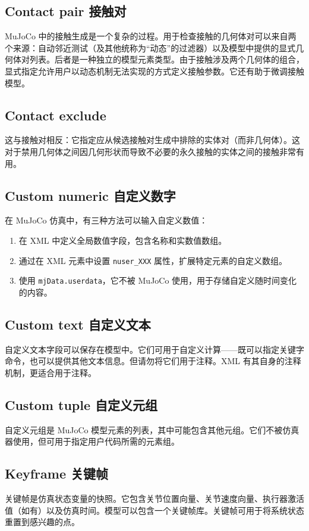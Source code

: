 \subsection{Contact pair 接触对}
MuJoCo 中的接触生成是一个复杂的过程。用于检查接触的几何体对可以来自两个来源：自动邻近测试（及其他统称为“动态”的过滤器）以及模型中提供的显式几何体对列表。后者是一种独立的模型元素类型。由于接触涉及两个几何体的组合，显式指定允许用户以动态机制无法实现的方式定义接触参数。它还有助于微调接触模型。

\subsection{Contact exclude}
这与接触对相反：它指定应从候选接触对生成中排除的实体对（而非几何体）。这对于禁用几何体之间因几何形状而导致不必要的永久接触的实体之间的接触非常有用。

\subsection{Custom numeric 自定义数字}
在 MuJoCo 仿真中，有三种方法可以输入自定义数值：
\begin{enumerate}
	\item 在 XML 中定义全局数值字段，包含名称和实数值数组。
	\item 通过在 XML 元素中设置 \texttt{nuser\_XXX} 属性，扩展特定元素的自定义数组。
	\item 使用 \texttt{mjData.userdata}，它不被 MuJoCo 使用，用于存储自定义随时间变化的内容。
\end{enumerate}

\subsection{Custom text 自定义文本}
自定义文本字段可以保存在模型中。它们可用于自定义计算——既可以指定关键字命令，也可以提供其他文本信息。但请勿将它们用于注释。XML 有其自身的注释机制，更适合用于注释。

\subsection{Custom tuple 自定义元组}
自定义元组是 MuJoCo 模型元素的列表，其中可能包含其他元组。它们不被仿真器使用，但可用于指定用户代码所需的元素组。

\subsection{Keyframe 关键帧}
关键帧是仿真状态变量的快照。它包含关节位置向量、关节速度向量、执行器激活值（如有）以及仿真时间。模型可以包含一个关键帧库。关键帧可用于将系统状态重置到感兴趣的点。
